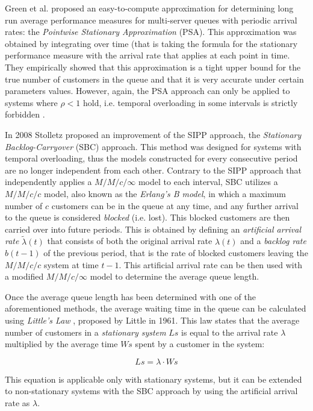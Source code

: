 Green et al.\cite{green1991} proposed an easy-to-compute approximation for determining long run average performance measures for multi-server queues with periodic arrival rates: the \emph{Pointwise Stationary Approximation} (PSA). This approximation was obtained by integrating over time (that is taking the formula for the stationary performance measure with the arrival rate that applies at each point in time. They empirically showed that this approximation is a tight upper bound for the true number of customers in the queue and that it is very accurate under certain parameters values. However, again, the PSA approach can only be applied to systems where \( \rho < 1 \) hold, i.e. temporal overloading in some intervals is strictly forbidden \cite{stolletz}.

In 2008 Stolletz \cite{stolletz} proposed an improvement of the SIPP approach, the \emph{Stationary Backlog-Carryover} (SBC) approach. This method was designed for systems with temporal overloading, thus the models constructed for every consecutive period are no longer independent from each other. Contrary to the SIPP approach that independently applies a \( M/M/c/\infty \) model to each interval, SBC utilizes a \( M/M/c/c \) model, also known as the \emph{Erlang’s B model}, in which a maximum number of \( c \) customers can be in the queue at any time, and any further arrival to the queue is considered \emph{blocked} (i.e. lost). This blocked customers are then carried over into future periods. This is obtained by defining an \emph{artificial arrival rate} \( \widetilde{\lambda}(t) \) that consists of both the original arrival rate \( \lambda(t) \) and a \emph{backlog rate} \( b(t-1) \) of the previous period, that is the rate of blocked customers leaving the \( M/M/c/c \) system at time \( t-1 \). This artificial arrival rate can be then used with a modified \( M/M/c/\infty \) model to determine the average queue length.

Once the average queue length has been determined with one of the aforementioned methods, the average waiting time in the queue can be calculated using \emph{Little’s Law} \cite{little}, proposed by Little in 1961. This law states that the average number of customers in a \emph{stationary system} \( Ls \) is equal to the arrival rate \( \lambda \) multiplied by the average time \( Ws \) spent by a customer in the system:

\begin{equation}
  Ls = \lambda \cdot Ws
  \label{eq:little_law}
\end{equation}

This equation is applicable only with stationary systems, but it can be extended to non-stationary systems with the SBC approach by using the artificial arrival rate as \( \lambda \).

\clearpage